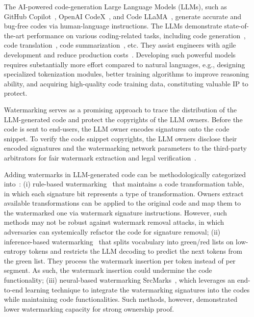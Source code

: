 The AI-powered code-generation Large Language Models (LLMs), such as GitHub Copilot~\cite{copilot}, OpenAI CodeX~\cite{chen2021evaluating}, and Code LLaMA~\cite{roziere2023code}, generate accurate and bug-free codes via human-language instructions. The LLMs demonstrate state-of-the-art performance on various coding-related tasks, including code generation~\cite{copilot,roziere2023code,luo2023wizardcoder}, code translation~\cite{pan2023understanding,roziere2021leveraging}, code summarization~\cite{ahmed2022few,gao2023makes}, etc. They assist engineers with agile development and reduce production costs~\cite{tan2023copilot}. 
Developing such powerful models requires substantially more effort compared to natural languages, e.g., designing specialized tokenization modules, better training algorithms to improve reasoning ability, and acquiring high-quality code training data, constituting valuable IP to protect.  

Watermarking serves as a promising approach to trace the distribution of the LLM-generated code and protect the copyrights of the LLM owners. Before the code is sent to end-users, the LLM owner encodes signatures onto the code snippet. To verify the code snippet copyrights, the LLM owners disclose their encoded signatures and the watermarking network parameters to the third-party arbitrators for fair watermark extraction and legal verification~\cite{zhang2024remark}. 

Adding watermarks in LLM-generated code can be methodologically categorized into~\cite{zhang2024remark}: (i) rule-based watermarking~\cite{li2023protecting} that maintains a code transformation table, in which each signature bit represents a type of transformation. Owners extract available transformations can be applied to the original code and map them to the watermarked one via watermark signature instructions. However, such methods may not be robust against watermark removal attacks, in which adversaries can systemically refactor the code for signature removal; (ii) inference-based watermarking~\cite{lee2023wrote} that splits vocabulary into green/red lists on low-entropy tokens and restricts the LLM decoding to predict the next tokens from the green list. They process the watermark insertion per token instead of per segment. As such, the watermark insertion could undermine the code functionality; (iii) neural-based watermarking SrcMarks~\cite{yang2023towards}, which leverages an end-to-end learning technique to integrate the watermarking signatures into the codes while maintaining code functionalities. Such methods, however, demonstrated lower watermarking capacity for strong ownership proof. 


